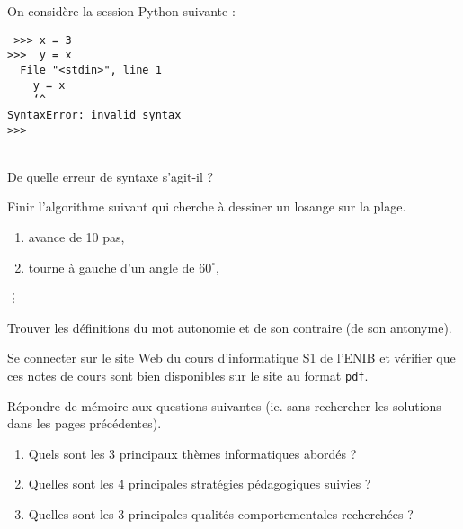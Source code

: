 	\begin{td}\label{td:erreur}
	On considère la session {\sc Python} suivante :\\[1mm]
	\mbox{}\hfill\begin{minipage}{7cm}\tt
	>>> x = 3\\
        >>> \ y = x\\
        \mbox{}\ \ File "<stdin>", line 1\\
        \mbox{}\ \ \ \ y = x\\
        \mbox{}\ \ \ \ \char`^\\
        SyntaxError: invalid syntax\\
        >>>
	\end{minipage}\\[1mm]
	De quelle erreur de syntaxe s'agit-il ?
	\end{td}
	
	\begin{td}\label{td:plage5}
	Finir l'algorithme suivant qui cherche à dessiner un losange sur la plage.
	\begin{enumerate}
	\item avance de 10 pas,
	\item tourne à gauche d'un angle de $60^\circ$,
	\end{enumerate}
	\hspace*{0.9cm}\vdots
	\end{td}
	
	\begin{td}[Autonomie]\label{td:autonomie}
	Trouver les définitions du mot autonomie et de son contraire (de son antonyme).
	\end{td}



\begin{td}\label{td:site}
Se connecter sur le site {\sc Web} du cours d'informatique S1 de l'ENIB et
vérifier que ces notes de cours sont bien disponibles sur le site
 au format {\tt pdf}.
\end{td}


\begin{td}\label{td:attention1}
Répondre de mémoire aux questions suivantes (ie. sans rechercher les 
solutions dans les pages précédentes).
\begin{enumerate}
\item Quels sont les 3 principaux thèmes informatiques abordés ?
\item Quelles sont les 4 principales stratégies péda\-go\-giques suivies ?
\item Quelles sont les 3 principales qualités comportementales recherchées ?
\end{enumerate}
\end{td}


